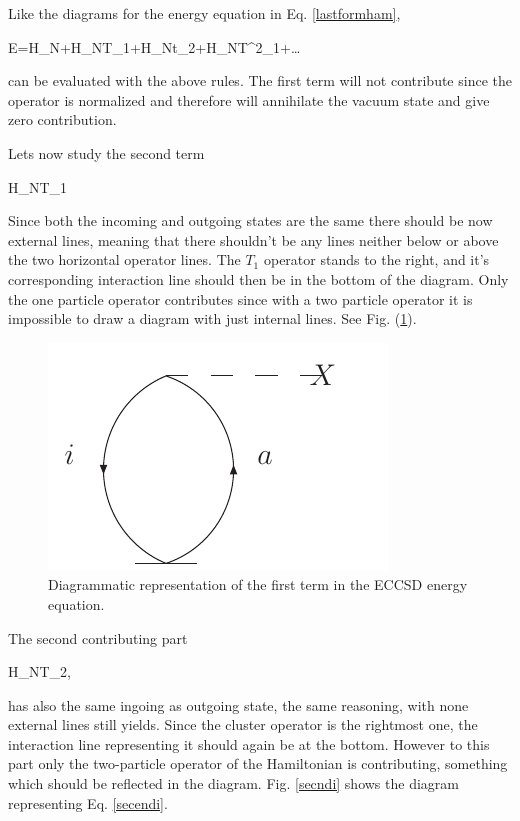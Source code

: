 Like the diagrams for the energy equation in Eq. \eqref{lastformham}, 

\be
E=H_N+H_NT_1+H_Nt_2+H_NT^2_1+\dots {}
\ee

can be evaluated with the above rules. The first term will not
contribute since the operator is normalized and therefore will
annihilate the vacuum state and give zero contribution.

Lets now study the second term


\be
{}H_NT_1
\label{firstendi}
\ee


Since both the incoming and outgoing states are the same there
should be now external lines, meaning that there shouldn't be 
any lines neither below or above the two horizontal operator 
lines. The $T_1$ operator stands to the right, and it's 
corresponding interaction line should then be in the bottom of 
the diagram. Only the one particle operator contributes since with a two 
particle operator it is impossible to draw a diagram with just internal 
lines. See Fig. (\ref{firstenedi}). 


\begin{figure}[htp]
\centering
\includegraphics[scale=0.75]{firstenedi}
\caption{Diagrammatic representation of the first term in the 
ECCSD energy equation.}
\label{firstenedi}
\end{figure}






The second contributing part

\be
{}H_NT_2,
\label{secendi}
\ee

has also the same ingoing as outgoing state, the same 
reasoning, with none external lines still yields. Since the 
cluster operator is the rightmost one, the interaction line 
representing it should again be at the bottom. However to this 
part only the two-particle operator of the Hamiltonian is 
contributing, something which should be reflected in the 
diagram. Fig. \ref{secndi} shows the diagram representing Eq. 
\eqref{secendi}.

